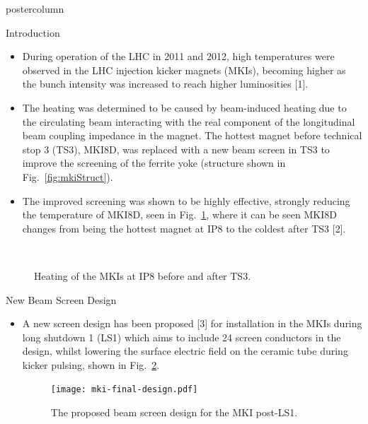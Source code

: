 \documentclass[final,hyperref={pdfpagelabels=false}]{beamer}
\begin{document}
\begin{frame}
\begin{columns}
\begin{column}{.49\textwidth}
\begin{beamercolorbox}[center,wd=\textwidth]{postercolumn}
\begin{minipage}[T]{.95\textwidth}
{\begin{block}{Introduction}
{	\begin{itemize}
	\item{During operation of the LHC in 2011 and 2012, high temperatures were observed in the LHC injection kicker magnets (MKIs), becoming higher as the bunch intensity was increased to reach higher luminosities [1].}
	\item{The heating was determined to be caused by beam-induced heating due to the circulating beam interacting with the real component of the longitudinal beam coupling impedance in the magnet. The hottest magnet before technical stop 3 (TS3), MKI8D, was replaced with a new beam screen in TS3 to improve the screening of the ferrite yoke (structure shown in Fig.~\ref{fig:mkiStruct}).}
	\item{The improved screening was shown to be highly effective, strongly reducing the temperature of MKI8D, seen in Fig.~\ref{fig:HeatingPt8}, where it can be seen MKI8D changes from being the hottest magnet at IP8 to the coldest after TS3 [2].}

	\end{itemize}
\begin{figure}
\\
\caption{Heating of the MKIs at IP8 before  and after  TS3.}
\label{fig:HeatingPt8}
\end{figure}
}
	\end{block}
 \vfill
\begin{block}{New Beam Screen Design}
\small{
\begin{itemize}
\item{A new screen design has been proposed [3] for installation in the MKIs during long shutdown 1 (LS1) which aims to include 24 screen conductors in the design, whilst lowering the surface electric field on the ceramic tube during kicker pulsing, shown in Fig.~\ref{fig:newScreenDesign}.}


\begin{figure}
\texttt{[image: mki-final-design.pdf]}
\caption{The proposed beam screen design for the MKI post-LS1.}
\label{fig:newScreenDesign}
\end{figure}


\end{itemize}}
\end{block}}
\end{minipage}
\end{beamercolorbox}
\end{column}
\end{columns}
\end{frame}
\end{document}

